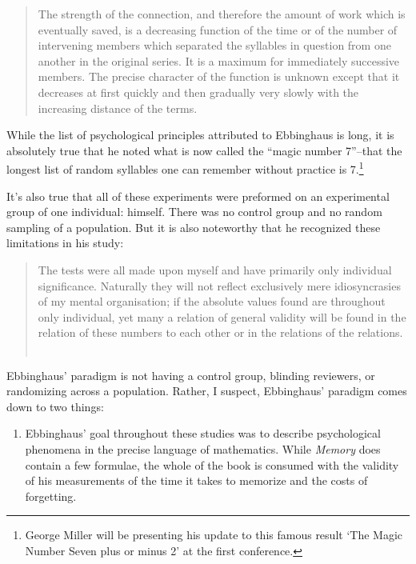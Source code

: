 \begin{refsection}
\begin{quote}

The strength of the connection, and therefore the amount of work which is eventually saved, is a decreasing function of the time or of the number of intervening members which separated the syllables in question from one another in the original series. It is a maximum for immediately successive members. The precise character of the function is unknown except that it decreases at first quickly and then gradually very slowly with the increasing distance of the terms. ~\citep[p. 107]{Ebbinghaus:1885ud}
\end{quote}

While the list of psychological principles attributed to Ebbinghaus is long, it is absolutely true that he noted what is now called the ``magic number 7''--that the longest list of random syllables one can remember without practice is 7.\footnote{George Miller will be presenting his update to this famous result `The Magic Number Seven plus or minus 2' at the first conference.} ~\citep[p. 47]{Ebbinghaus:1885ud}

It's also true that all of these experiments were preformed on an experimental group of one individual: himself. There was no control group and no random sampling of a population. But it is also noteworthy that he recognized these limitations in his study: 

\begin{quote}

The tests were all made upon myself and have primarily only individual significance. Naturally they will not reflect exclusively mere idiosyncrasies of my mental organisation; if the absolute values found are throughout only individual, yet many a relation of general validity will be found in the relation of these numbers to each other or in the relations of the relations. ~\citep[Author's preface, p. v]{Ebbinghaus:1885ud}
\end{quote}

Ebbinghaus' paradigm is not having a control group, blinding reviewers, or randomizing across a population. Rather, I suspect, Ebbinghaus' paradigm comes down to two things:

\begin{enumerate}
\item Ebbinghaus' goal throughout these studies was to describe psychological phenomena in the precise language of mathematics. While \emph{Memory} does contain a few formulae, the whole of the book is consumed with the validity of his measurements of the time it takes to memorize and the costs of forgetting.


\end{enumerate}
\end{refsection}
